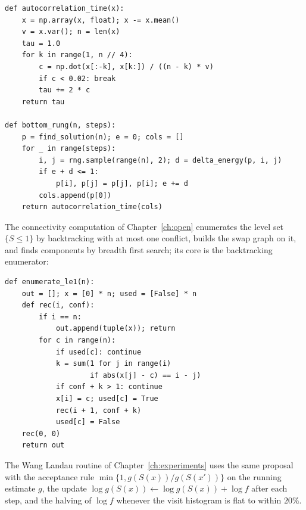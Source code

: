 \begin{footnotesize}
\begin{verbatim}
def autocorrelation_time(x):
    x = np.array(x, float); x -= x.mean()
    v = x.var(); n = len(x)
    tau = 1.0
    for k in range(1, n // 4):
        c = np.dot(x[:-k], x[k:]) / ((n - k) * v)
        if c < 0.02: break
        tau += 2 * c
    return tau

def bottom_rung(n, steps):
    p = find_solution(n); e = 0; cols = []
    for _ in range(steps):
        i, j = rng.sample(range(n), 2); d = delta_energy(p, i, j)
        if e + d <= 1:
            p[i], p[j] = p[j], p[i]; e += d
        cols.append(p[0])
    return autocorrelation_time(cols)
\end{verbatim}
\end{footnotesize}

The connectivity computation of Chapter~\ref{ch:open} enumerates the level set $\{ S \le 1 \}$ by backtracking with at most one conflict, builds the swap graph on it, and finds components by breadth first search; its core is the backtracking enumerator:

\begin{footnotesize}
\begin{verbatim}
def enumerate_le1(n):
    out = []; x = [0] * n; used = [False] * n
    def rec(i, conf):
        if i == n:
            out.append(tuple(x)); return
        for c in range(n):
            if used[c]: continue
            k = sum(1 for j in range(i)
                    if abs(x[j] - c) == i - j)
            if conf + k > 1: continue
            x[i] = c; used[c] = True
            rec(i + 1, conf + k)
            used[c] = False
    rec(0, 0)
    return out
\end{verbatim}
\end{footnotesize}

The Wang Landau routine of Chapter~\ref{ch:experiments} uses the same proposal with the acceptance rule $\min\{1, g(S(x)) / g(S(x'))\}$ on the running estimate $g$, the update $\log g(S(x)) \leftarrow \log g(S(x)) + \log f$ after each step, and the halving of $\log f$ whenever the visit histogram is flat to within $20\%$.
